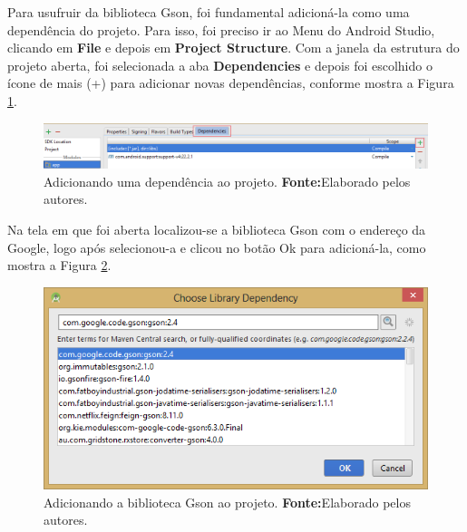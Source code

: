 	\par Para usufruir da biblioteca Gson, foi fundamental adicioná-la como uma
dependência do projeto. Para isso, foi preciso ir ao Menu do Android Studio,
clicando em \textbf{File} e depois em \textbf{Project Structure}. Com a janela
da estrutura do projeto aberta, foi selecionada a aba \textbf{Dependencies} e
depois foi escolhido o ícone de mais (+) para adicionar novas dependências,
conforme mostra a Figura \ref{fig:app6}.
	
	\begin{landscape}
	
		\begin{figure}[h!] 
			\centerline{\includegraphics[scale=0.7]{./imagens/2_q_metodologico/4_procedimentos_resultados/42_aplicativo/app6.png}}
			\caption[Adicionando uma dependência ao projeto]{Adicionando uma dependência ao projeto.
			\textbf{Fonte:}Elaborado pelos autores.}
			\label{fig:app6}
		\end{figure}
	
	\pagebreak
	
	\end{landscape}
	
	\par Na tela em que foi aberta localizou-se a biblioteca Gson com o endereço da
Google, logo após selecionou-a e clicou no botão Ok para adicioná-la, como
mostra a Figura \ref{fig:app7}.
	
		\begin{figure}[h!] 
			\centerline{\includegraphics[scale=0.7]{./imagens/2_q_metodologico/4_procedimentos_resultados/42_aplicativo/app7.png}}
			\caption[Adicionando a biblioteca Gson ao projeto]{Adicionando a biblioteca Gson ao projeto.
			\textbf{Fonte:}Elaborado pelos autores.}
			\label{fig:app7}
		\end{figure}

